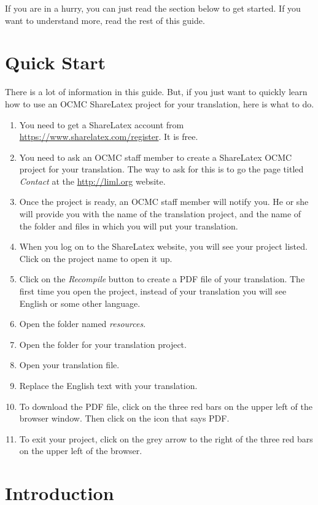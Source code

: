 \documentclass[]{memoir}
\begin{document}

If you are in a hurry, you can just read the section below to get started.  If you want to understand more, read the rest of this guide.

\chapter{Quick Start}
There is a lot of information in this guide.  But, if you just want to quickly learn how to use an OCMC ShareLatex project for your translation, here is what to do.
\begin{enumerate}
    \item You need to get a ShareLatex account from \url{https://www.sharelatex.com/register}.  It is free.
    \item You need to ask an OCMC staff member to create a ShareLatex OCMC project for your translation.  The way to ask for this is to go the page titled \emph{Contact} at the \url{http://liml.org} website.
    \item Once the project is ready, an OCMC staff member will notify you.  He or she will provide you with the name of the translation project, and the name of the folder and files in which you will put your translation.
    \item When you log on to the ShareLatex website, you will see your project listed.  Click on the project name to open it up.
    \item Click on the \textit{Recompile} button to create a PDF file of your translation.  The first time you open the project, instead of your translation you will see English or some other language.
    \item Open the folder named \textit{resources}.
    \item Open the folder for your translation project.
    \item Open your translation file.
    \item Replace the English text with your translation.
    \item To download the PDF file, click on the three red bars on the upper left of the browser window. Then click on the icon that says PDF.  
    \item To exit your project, click on the grey arrow to the right of the three red bars on the upper left of the browser.
\end{enumerate}
\chapter{Introduction}
\end{document}
